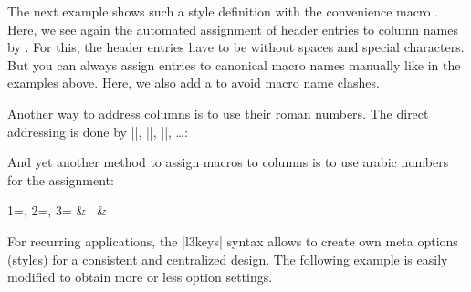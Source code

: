 \documentclass[a4paper,11pt]{ltxdoc}
\begin{document}
\clearpage
The next example shows such a style definition with the convenience macro
. Here, we see again the automated assignment of header
entries to column names by .
For this, the header entries have to be without spaces and special characters.
But you can always assign entries to canonical macro names manually like in the examples
above. Here, we also add a  to avoid
macro name clashes.

\begin{dispExample}

\end{dispExample}


\smallskip
Another way to address columns is to use their roman numbers.
The direct addressing is done by |\csvcoli|, |\csvcolii|, |\csvcoliii|, \ldots:

\begin{dispExample}
\end{dispExample}

\smallskip
And yet another method to assign macros to columns is to use arabic numbers
for the assignment:

\begin{dispExample}
  {1=\name, 2=\firstname, 3=\matnumber}{%
    \thecsvrow & \firstname~\name & \matnumber
  }
\end{dispExample}

\smallskip
For recurring applications, the |l3keys| syntax allows to create own meta options
(styles) for a consistent and centralized design. The following example is easily
modified to obtain more or less option settings.
\end{document}
